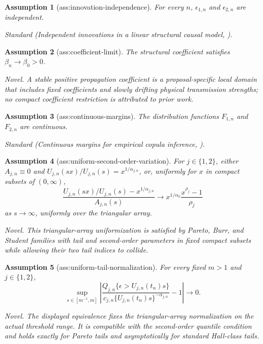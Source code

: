 \documentclass{article}
\newtheorem{assumption}{Assumption}
\begin{document}
\begin{assumption}[ass:innovation-independence]\label{ass:innovation-independence}
For every \(n\), \(\epsilon_{1,n}\) and \(\epsilon_{2,n}\) are independent.
\par\smallskip\noindent\emph{Standard} (Independent innovations in a linear structural causal model, \cite{GneccoEtAl2021}).
\end{assumption}

\begin{assumption}[ass:coefficient-limit]\label{ass:coefficient-limit}
The structural coefficient satisfies \(\beta_n\to\beta_0>0\).
\par\smallskip\noindent\emph{Novel.} A stable positive propagation coefficient is a proposal-specific local domain that includes fixed coefficients and slowly drifting physical transmission strengths; no compact coefficient restriction is attributed to prior work.
\end{assumption}

\begin{assumption}[ass:continuous-margins]\label{ass:continuous-margins}
The distribution functions \(F_{1,n}\) and \(F_{2,n}\) are continuous.
\par\smallskip\noindent\emph{Standard} (Continuous margins for empirical copula inference, \cite{BuecherDette2013}).
\end{assumption}

\begin{assumption}[ass:uniform-second-order-variation]\label{ass:uniform-second-order-variation}
For \(j\in\{1,2\}\), either \(A_{j,n}\equiv0\) and \(U_{j,n}(sx)/U_{j,n}(s)=x^{1/\alpha_{j,n}}\), or, uniformly for \(x\) in compact subsets of \((0,\infty)\), \[\frac{U_{j,n}(sx)/U_{j,n}(s)-x^{1/\alpha_{j,n}}}{A_{j,n}(s)}\to x^{1/\alpha_0}\frac{x^{\rho_j}-1}{\rho_j}\] as \(s\to\infty\), uniformly over the triangular array.
\par\smallskip\noindent\emph{Novel.} This triangular-array uniformization is satisfied by Pareto, Burr, and Student families with tail and second-order parameters in fixed compact subsets while allowing their two tail indices to collide.
\end{assumption}

\begin{assumption}[ass:uniform-tail-normalization]\label{ass:uniform-tail-normalization}
For every fixed \(m>1\) and \(j\in\{1,2\}\), \[\sup_{s\in[m^{-1},m]}\left|\frac{Q_{j,n}\{\epsilon>U_{j,n}(t_n)s\}}{c_{j,n}\{U_{j,n}(t_n)s\}^{-\alpha_{j,n}}}-1\right|\to0.\]
\par\smallskip\noindent\emph{Novel.} The displayed equivalence fixes the triangular-array normalization on the actual threshold range. It is compatible with the second-order quantile condition and holds exactly for Pareto tails and asymptotically for standard Hall-class tails.
\end{assumption}
\end{document}
